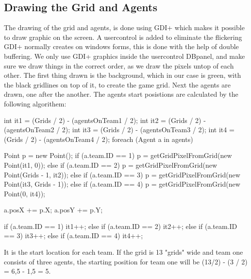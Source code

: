 \subsection*{Drawing the Grid and Agents}
\label{sec:drawing}
The drawing of the grid and agents, is done using GDI+ \cite{gdiplus} which makes it possible to draw graphic on the screen. A usercontrol is added to eliminate the flickering GDI+ normally creates on windows forms, this is done with the help of double buffering.
We only use GDI+ graphics inside the usercontrol DBpanel, and make sure we draw things in the correct order, as we draw the pixels untop of each other. The first thing drawn is the background, which in our case is green, with the black gridlines on top of it, to create the game grid. Next the agents are drawn, one after the another.
The agents start posistions are calculated by the following algorithem:
\begin{source}[]{}                    
            int it1 = (Grids / 2) - (agentsOnTeam1 / 2);
            int it2 = (Grids / 2) - (agentsOnTeam2 / 2);
            int it3 = (Grids / 2) - (agentsOnTeam3 / 2);
            int it4 = (Grids / 2) - (agentsOnTeam4 / 2);
            foreach (Agent a in agents)
            {
                Point p = new Point();
                if (a.team.ID == 1)
                {
                    p = getGridPixelFromGrid(new Point(it1, 0));
                }
                else if (a.team.ID == 2)
                {
                    p = getGridPixelFromGrid(new Point(Grids - 1, it2));
                }
                else if (a.team.ID == 3)
                {
                    p = getGridPixelFromGrid(new Point(it3, Grids - 1));
                }
                else if (a.team.ID == 4)
                {
                    p = getGridPixelFromGrid(new Point(0, it4));
                }

                a.posX += p.X;
                a.posY += p.Y;

                if (a.team.ID == 1)
                {
                    it1++;
                }
                else if (a.team.ID == 2)
                {
                    it2++;
                }
                else if (a.team.ID == 3)
                {
                    it3++;
                }
                else if (a.team.ID == 4)
                {
                    it4++;
                }
            }
\end{source}
It is the start location for each team. If the grid is 13 "grids" wide and team one consists of three agents, the starting position for team one will be (13/2) - (3 / 2) = 6,5 - 1,5 = 5.